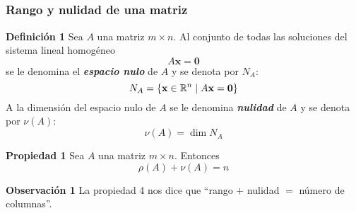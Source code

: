 

\subsection{}

{\nologo
\begin{frame}\frametitle{Rango y nulidad de una matriz}

\vspace{-3mm}
\begin{defi}{\textbf{Definición 1}}
	Sea $A$ una matriz $m\times n$. Al conjunto de todas las soluciones del sistema lineal
	homogéneo
	\[
	A \mathbf{x} =  \mathbf{0}
	\]
	se le denomina el \textbf{\textit{espacio nulo}} de $A$ y se denota por $N_A$:
	\[
	N_A = \{ \mathbf{x}\in \mathbb{R}^n \mid A \mathbf{x} =  \mathbf{0} \}	
	\]
	A la dimensión del espacio nulo de $A$ se le denomina \textbf{\textit{nulidad}} de $A$ y se denota por $\nu(A)$:
	\[
	\nu(A) = \dim N_A
	\]
\end{defi}	

\vspace{-2mm}

\begin{prop}{\textbf{Propiedad 1}}
	\justifying
	Sea $A$ una matriz $m\times n$. Entonces
	\[
		\rho(A) + \nu(A) = n
	\]
\end{prop}	

\vspace{-2mm}

\begin{alertblock}{\textbf{Observación 1}}
	La propiedad 4 nos dice que ``rango $+$ nulidad $=$ número de columnas''.
\end{alertblock}

\end{frame}
}


\subsection{}

